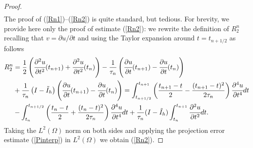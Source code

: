 \documentclass{imanum}
\begin{document}
\begin{proof}
\begin{align}
\end{align}
The proof of (\ref{Rn1})--(\ref{Rn2}) is quite standard, but tedious. For brevity, we provide here only the proof of estimate (\ref{Rn2}): we rewrite the definition of $R^n_2$ recalling that $v = \partial u/\partial t$ and using the Taylor expansion around $t=t_{n+1/2 }$ as follows
\begin{align*}
      R^n_2 &= \frac 12\left(\cfrac{\partial^2 u}{\partial t^2} ( t_{n+1}) + \cfrac{\partial^2 u}{\partial t^2} ( t_{n})\right) - \frac {1}{\tau_n}\left(\cfrac{\partial u}{\partial t} ( t_{n+1}) - \cfrac{\partial u}{\partial t} ( t_{n})\right)\\
     & + \frac {1}{\tau_n}\left( I - \tilde I_h\right)  \left(\cfrac{\partial u}{\partial t} ( t_{n+1}) - \cfrac{\partial u}{\partial t} ( t_{n})\right)
      =  \int_{t_{n + 1 / 2}}^{t_{n + 1}} \left(
  \frac{t_{n + 1} - t}{2} - \frac{( t_{n + 1} - t)^2}{2 \tau_n} \right)\cfrac{\partial^4
   u}{\partial t^4}
  dt \\
  & - \int_{t_n}^{t_{n + 1 / 2}} \left( \frac{t_n - t}{2}
  + \frac{( t_n - t)^2}{2 \tau_n} \right) \cfrac{\partial^4
   u}{\partial t^4}dt  + \frac{1}{\tau_n}
  ( I - \tilde I_h) \int_{t_n}^{t_{n + 1}} \cfrac{\partial^2
   u}{\partial t^2} dt.
\end{align*}
Taking the $L^2(\Omega)$ norm on both sides and applying the projection error estimate (\ref{Pinterp}) in $L^2(\Omega)$ we obtain (\ref{Rn2}).


\end{proof}
\end{document}
